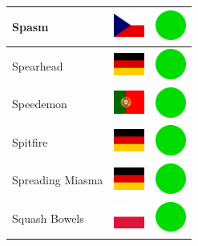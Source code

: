 \documentclass[12pt, a4paper, twoside]{report}
\begin{document}
\begin{center}
\begin{longtable}{|p{5cm}|p{2cm}|p{2cm}|}
 Spasm                                                      & \includegraphics[width=1cm]{../img/flags/cz} &   \includegraphics[width=1cm]{../likes/y} \\ \hline
 Spearhead                                                  & \includegraphics[width=1cm]{../img/flags/de} &   \includegraphics[width=1cm]{../likes/y} \\ \hline
 Speedemon                                                  & \includegraphics[width=1cm]{../img/flags/pt} &   \includegraphics[width=1cm]{../likes/y} \\ \hline
 Spitfire                                                   & \includegraphics[width=1cm]{../img/flags/de} &   \includegraphics[width=1cm]{../likes/y} \\ \hline
 Spreading Miasma                                           & \includegraphics[width=1cm]{../img/flags/de} &   \includegraphics[width=1cm]{../likes/y} \\ \hline
 Squash Bowels                                              & \includegraphics[width=1cm]{../img/flags/pl} &   \includegraphics[width=1cm]{../likes/y} \\ \hline

\end{longtable}
\end{center}
\end{document}

